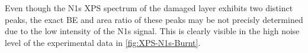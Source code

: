 Even though the N1s \ac{XPS} spectrum of the damaged layer exhibits two distinct peaks, the exact \ac{BE} and area ratio of these peaks may be not precisly determined due to the low intensity of the N1s signal. This is clearly visible in the high noise level of the experimental data in \autoref{fig:XPS-N1s-Burnt}.

\cleardoublepage